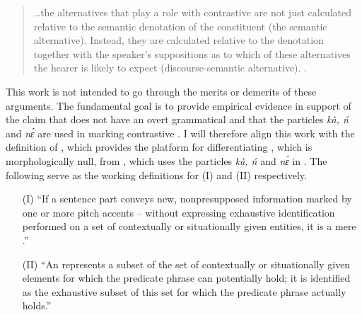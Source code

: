 \documentclass[output=paper,modfonts,nonflat,
\ChapterDOI{10.5281/zenodo.3367154}
 hidelinks
]{langsci/langscibook}
\begin{document}
\begin{quote}
…the alternatives that play a role with contrastive  are not just calculated relative to the semantic denotation of the  constituent (the semantic alternative). Instead, they are calculated relative to the  denotation together with the speaker’s suppositions as to which of these alternatives the hearer is likely to expect (discourse-semantic alternative). \citep[3]{Zimmermann2008}. 
\end{quote}

This work is not intended to go through the merits or demerits of these arguments. The fundamental goal is to provide empirical evidence in support of the claim that  does not have an overt grammatical  and that the particles \textit{kà, ń} and \textit{nɛ́} are used in marking contrastive . I will therefore align this work with the definition of \citet{ÉKiss1998}, which provides the platform for differentiating , which is morphologically null, from , which uses the particles \textit{kà, ń} and \textit{nɛ́} in . The following serve as the working definitions for (I)  and (II)  respectively. 

\begin{enumerate}
	\item[(I)]  ``If a sentence part conveys new, nonpresupposed information marked by one or more pitch accents – without expressing exhaustive identification performed on a set of contextually or situationally given entities, it is a mere .”  \citep[246]{ÉKiss1998}
 

 
	\item[(II)]  ``An  represents a subset of the set of contextually or situationally given elements for which the predicate phrase can potentially hold; it is identified as the exhaustive subset of this set for which the predicate phrase actually holds.” \citep[249]{ÉKiss1998}
\end{enumerate}  
\end{document}

